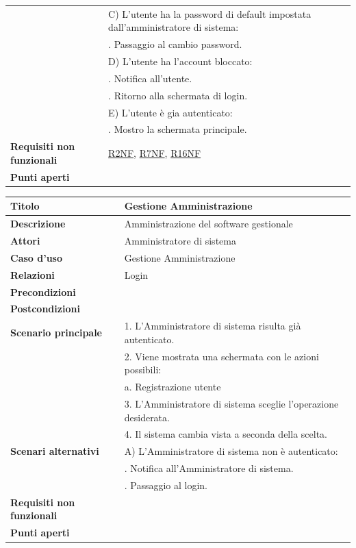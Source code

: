 \documentclass[a4paper]{article}
\begin{document}
\begin{center}
\begin{tabularx}{1\textwidth}{|l|X|}
								 & C) L'utente ha la password di default impostata dall'amministratore di sistema:\\
								 & \quad 1. Passaggio al cambio password.\\
								 & D) L'utente ha l'account bloccato:\\
								 & \quad 1. Notifica all'utente.\\
								 & \quad 2. Ritorno alla schermata di login.\\
								 & E) L'utente è gia autenticato:\\
								 & \quad 1. Mostro la schermata principale.\\
	\hline
	\textbf{Requisiti non funzionali} & \hyperlink{R2NF}{R2NF}, \hyperlink{R7NF}{R7NF}, \hyperlink{R16NF}{R16NF} \\
	\hline
	\textbf{Punti aperti} & \\
	\hline
\end{tabularx}
\end{center}
  

\begin{center}
\begin{tabularx}{1\textwidth}{|l|X|}
    \hline
	\textbf{Titolo} & Gestione Amministrazione \\
	\hline
	\textbf{Descrizione} & Amministrazione del software gestionale \\
	\hline
	\textbf{Attori} & Amministratore di sistema \\
	\hline
	\textbf{Caso d'uso} & Gestione Amministrazione \\
	\hline
	\textbf{Relazioni} & Login \\
	\hline
	\textbf{Precondizioni} &  \\
	\hline
	\textbf{Postcondizioni} &  \\
	\hline
	\textbf{Scenario principale} & 1. L'Amministratore di sistema risulta già autenticato.\\
	                             & 2. Viene mostrata una schermata con le azioni possibili:\\
								 & \quad a. Registrazione utente\\
								 & 3. L'Amministratore di sistema sceglie l'operazione desiderata.\\
								 & 4. Il sistema cambia vista a seconda della scelta.\\
	\hline
	\textbf{Scenari alternativi} & A) L'Amministratore di sistema non è autenticato: \\
								 & \quad 1. Notifica all'Amministratore di sistema.\\
								 & \quad 2. Passaggio al login.\\
	\hline
	\textbf{Requisiti non funzionali} & \\
	\hline
	\textbf{Punti aperti} & \\
	\hline
\end{tabularx}
\end{center}
\end{document}
